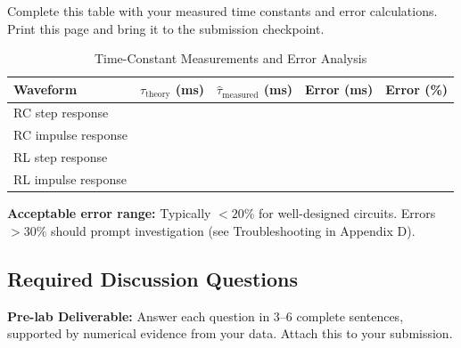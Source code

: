 \documentclass[11pt,letterpaper]{article}
\providecommand{\pldECE}[1]{\textcolor{BrickRed}{\textbf{Pre-lab Deliverable:} #1}}
\begin{document}
Complete this table with your measured time constants and error calculations. Print this page and bring it to the submission checkpoint.

\begin{table}[H]
    \centering
    \caption{Time-Constant Measurements and Error Analysis}
    \label{tab:results}
    \begin{tabularx}{\linewidth}{l c c c c}
    \toprule
    \textbf{Waveform} & $\tau_{\text{theory}}$ (ms) & $\hat{\tau}_{\text{measured}}$ (ms) & Error (ms) & Error (\%)\\
    \midrule
    RC step response & \underline{\hspace{1.8cm}} & \underline{\hspace{1.8cm}} & \underline{\hspace{1.5cm}} & \underline{\hspace{1.3cm}} \\
    RC impulse response & \underline{\hspace{1.8cm}} & \underline{\hspace{1.8cm}} & \underline{\hspace{1.5cm}} & \underline{\hspace{1.3cm}} \\
    RL step response & \underline{\hspace{1.8cm}} & \underline{\hspace{1.8cm}} & \underline{\hspace{1.5cm}} & \underline{\hspace{1.3cm}} \\
    RL impulse response & \underline{\hspace{1.8cm}} & \underline{\hspace{1.8cm}} & \underline{\hspace{1.5cm}} & \underline{\hspace{1.3cm}} \\
    \bottomrule
    \end{tabularx}
\end{table}

\noindent
\textbf{Acceptable error range:} Typically $< 20\%$ for well-designed circuits. Errors $> 30\%$ should prompt investigation (see Troubleshooting in Appendix D).

\subsection{Required Discussion Questions}

\pldECE{Answer each question in 3--6 complete sentences, supported by numerical evidence from your data. Attach this to your submission.}
\end{document}
